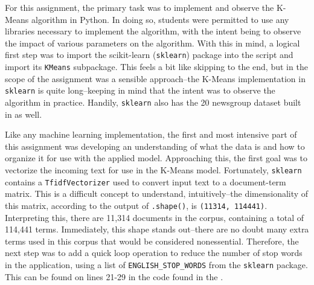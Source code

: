 \documentclass[11pt]{article}
\begin{document}
  
  \graphicspath{{./images/}}
\newpage
For this assignment, the primary task was to implement and observe the K-Means algorithm in Python.
In doing so, students were permitted to use any libraries necessary to implement the algorithm, with the intent being to observe the impact of various parameters on the algorithm.
With this in mind, a logical first step was to import the scikit-learn (\lstinline{sklearn}) package into the script and import its \lstinline{KMeans} subpackage.
This feels a bit like skipping to the end, but in the scope of the assignment was a sensible approach--the K-Means implementation in \lstinline{sklearn} is quite long--keeping in mind that the intent was to observe the algorithm in practice.
Handily, \lstinline{sklearn} also has the 20 newsgroup dataset built in as well.

Like any machine learning implementation, the first and most intensive part of this assignment was developing an understanding of what the data is and how to organize it for use with the applied model.
Approaching this, the first goal was to vectorize the incoming text for use in the K-Means model.
Fortunately, \lstinline{sklearn} contains a \lstinline{TfidfVectorizer} used to convert input text to a document-term matrix.
This is a difficult concept to understand, intuitively--the dimensionality of this matrix, according to the output of \lstinline{.shape()}, is \lstinline{(11314, 114441)}.
Interpreting this, there are 11,314 documents in the corpus, containing a total of 114,441 terms.
Immediately, this shape stands out--there are no doubt many extra terms used in this corpus that would be considered nonessential.
Therefore, the next step was to add a quick loop operation to reduce the number of stop words in the application, using a list of \lstinline{ENGLISH_STOP_WORDS} from the \lstinline{sklearn} package.
This can be found on lines 21-29 in the code found in the .
\end{document}
